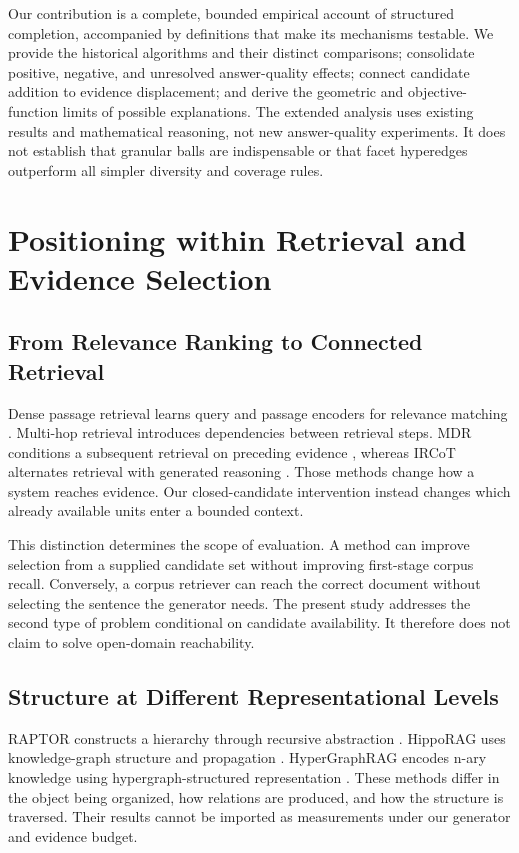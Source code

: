 \documentclass[11pt,a4paper]{article}
\begin{document}
Our contribution is a complete, bounded empirical account of structured
completion, accompanied by definitions that make its mechanisms testable.
We provide the historical algorithms and their distinct comparisons;
consolidate positive, negative, and unresolved answer-quality effects;
connect candidate addition to evidence displacement; and derive the geometric
and objective-function limits of possible explanations. The extended analysis
uses existing results and mathematical reasoning, not new answer-quality
experiments. It does not establish that granular balls are indispensable or
that facet hyperedges outperform all simpler diversity and coverage rules.

\section{Positioning within Retrieval and Evidence Selection}
\subsection{From Relevance Ranking to Connected Retrieval}
Dense passage retrieval learns query and passage encoders for relevance
matching \citep{karpukhin2020dpr}. Multi-hop retrieval introduces dependencies
between retrieval steps. MDR conditions a subsequent retrieval on preceding
evidence \citep{xiong2021mdr}, whereas IRCoT alternates retrieval with generated
reasoning \citep{trivedi2023ircot}. Those methods change how a system reaches
evidence. Our closed-candidate intervention instead changes which already
available units enter a bounded context.

This distinction determines the scope of evaluation. A method can improve
selection from a supplied candidate set without improving first-stage corpus
recall. Conversely, a corpus retriever can reach the correct document without
selecting the sentence the generator needs. The present study addresses the
second type of problem conditional on candidate availability. It therefore
does not claim to solve open-domain reachability.

\subsection{Structure at Different Representational Levels}
RAPTOR constructs a hierarchy through recursive abstraction
\citep{sarthi2024raptor}. HippoRAG uses knowledge-graph structure and
propagation \citep{gutierrez2024hipporag}. HyperGraphRAG encodes n-ary
knowledge using hypergraph-structured representation
\citep{luo2025hypergraphrag}. These methods differ in the object being
organized, how relations are produced, and how the structure is traversed.
Their results cannot be imported as measurements under our generator and
evidence budget.
\end{document}
